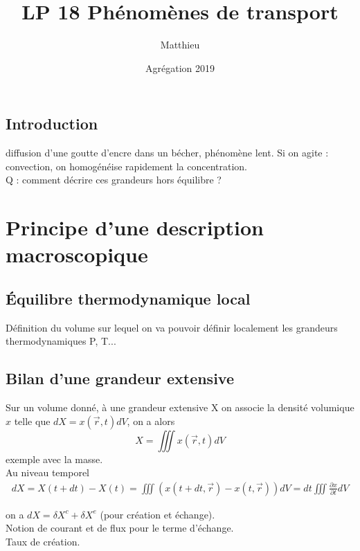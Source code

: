 \documentclass[12pt,prb,aps,epsf]{article}
\begin{document}
	
	\title{LP 18 Phénomènes de transport}
	\author{Matthieu}
	\date{Agrégation 2019}
	
	\maketitle
	
	\tableofcontents
	
	\pagebreak
	
\subsection{Introduction}
diffusion d'une goutte d'encre dans un bécher, phénomène lent. Si on agite : convection, on homogénéise rapidement la concentration.\\

Q :  comment décrire ces grandeurs hors équilibre ?

\section{Principe d'une description macroscopique}
\subsection{Équilibre thermodynamique local}
Définition du volume sur lequel on va pouvoir définir localement les grandeurs thermodynamiques P, T...

\subsection{Bilan d'une grandeur extensive}
Sur un volume donné, à une grandeur extensive X on associe la densité volumique $x$ telle que $dX = x(\vec{r},t)dV$, on a alors 
\begin{equation}
X = \iiint x(\vec{r},t) dV
\end{equation}
	exemple avec la masse.\\
	
Au niveau temporel 
\begin{eqnarray}
	dX = X(t+dt)-X(t) = \iiint (x(t+dt,\vec{r}) - x(t,\vec{r}))dV = dt \iiint \frac{\partial x}{\partial t}dV
\end{eqnarray}

on a $dX = \delta X^c + \delta X^e$ (pour création et échange).\\
Notion de courant et de flux pour le terme d'échange.\\
Taux de création.	\\
\end{document}

